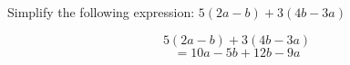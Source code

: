\question Simplify the following expression: 
$5(2a-b) + 3(4b-3a)$
\begin{solution}
	\[
		5(2a-b) + 3(4b-3a)
	\]
	\[
		= 10a - 5b + 12b - 9a
	\]
\end{solution}

